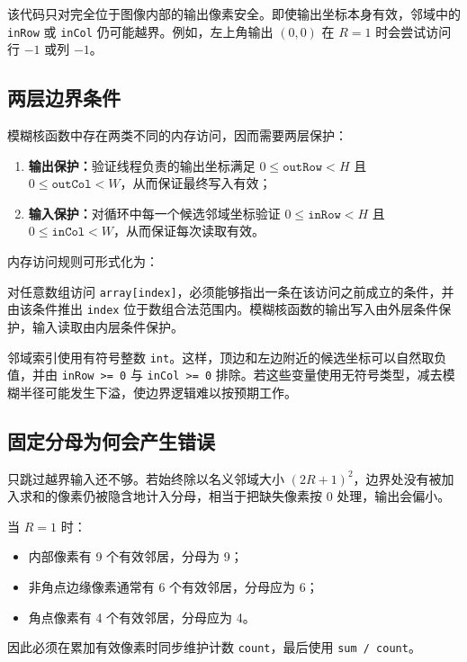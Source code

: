 该代码只对完全位于图像内部的输出像素安全。即使输出坐标本身有效，邻域中的 \texttt{inRow} 或 \texttt{inCol} 仍可能越界。例如，左上角输出 $(0,0)$ 在 $R=1$ 时会尝试访问行 $-1$ 或列 $-1$。

\subsection{两层边界条件}

模糊核函数中存在两类不同的内存访问，因而需要两层保护：
\begin{enumerate}
  \item \textbf{输出保护：}验证线程负责的输出坐标满足 $0\leq\texttt{outRow}<H$ 且 $0\leq\texttt{outCol}<W$，从而保证最终写入有效；
  \item \textbf{输入保护：}对循环中每一个候选邻域坐标验证 $0\leq\texttt{inRow}<H$ 且 $0\leq\texttt{inCol}<W$，从而保证每次读取有效。
\end{enumerate}

内存访问规则可形式化为：
\begin{warningbox}[title=每次内存访问都必须有对应的索引保护]
对任意数组访问 \texttt{array[index]}，必须能够指出一条在该访问之前成立的条件，并由该条件推出 \texttt{index} 位于数组合法范围内。模糊核函数的输出写入由外层条件保护，输入读取由内层条件保护。
\end{warningbox}

邻域索引使用有符号整数 \texttt{int}。这样，顶边和左边附近的候选坐标可以自然取负值，并由 \texttt{inRow >= 0} 与 \texttt{inCol >= 0} 排除。若这些变量使用无符号类型，减去模糊半径可能发生下溢，使边界逻辑难以按预期工作。

\subsection{固定分母为何会产生错误}

只跳过越界输入还不够。若始终除以名义邻域大小 $(2R+1)^2$，边界处没有被加入求和的像素仍被隐含地计入分母，相当于把缺失像素按 0 处理，输出会偏小。

当 $R=1$ 时：
\begin{itemize}
  \item 内部像素有 9 个有效邻居，分母为 9；
  \item 非角点边缘像素通常有 6 个有效邻居，分母应为 6；
  \item 角点像素有 4 个有效邻居，分母应为 4。
\end{itemize}

因此必须在累加有效像素时同步维护计数 \texttt{count}，最后使用 \texttt{sum / count}。

